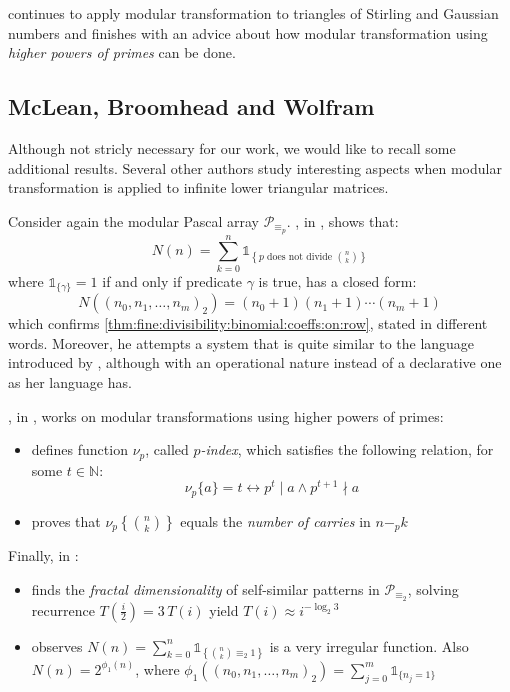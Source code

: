 \citeauthor{sved:1988} continues to apply modular transformation to triangles
of Stirling and Gaussian numbers and finishes with an advice about how modular
transformation using \emph{higher powers of primes} can be done.

\subsection{McLean, Broomhead and Wolfram}

Although not stricly necessary for our work, we would like to recall some
additional results. Several other authors study interesting aspects when
modular transformation is applied to infinite lower triangular matrices.

Consider again the modular Pascal array $\mathcal{P}_{\equiv_{p}}$.
\citeauthor{broomhead:1972}, in \cite{broomhead:1972}, shows that:
\begin{displaymath}
    N(n)=\sum_{k=0}^{n}{\mathbb{1}_{\left\lbrace p\text{ does not divide }{{n}\choose{k}}\right\rbrace}}
\end{displaymath}
where $\mathbb{1}_{\lbrace \gamma \rbrace}=1$ if and only if predicate $\gamma$ is true,
has a closed form:
\begin{displaymath}
    N((n_{0},n_{1},\ldots,n_{m})_{2})=(n_{0}+1)(n_{1}+1)\cdots(n_{m}+1)
\end{displaymath}
which confirms \autoref{thm:fine:divisibility:binomial:coeffs:on:row}, stated in different words.
Moreover, he attempts a system that is quite similar to the language introduced by \citeauthor{sved:1988},
although with an operational nature instead of a declarative one as her language has.

\citeauthor{mclean:1974}, in \cite{mclean:1974}, works on modular transformations using
higher powers of primes:
\begin{itemize}
    \item defines function $\nu_{p}$, called \emph{$p$-index}, which satisfies the following relation,
        for some $t\in\mathbb{N}$: 
        \begin{displaymath}
            \nu_{p}\lbrace a\rbrace =t \leftrightarrow p^{t}\mid a \wedge p^{t+1}\nmid a
        \end{displaymath}
    \item proves that {$\nu_{p}\left\lbrace {{n}\choose{k}}\right\rbrace $} 
        equals the \emph{number of carries} in $n-_{p}k$
\end{itemize}

Finally, \citeauthor{wolfram:1984} in \cite{wolfram:1984}:
\begin{itemize}
    \item finds the \emph{fractal dimensionality} of self-similar patterns in $\mathcal{P}_{\equiv_{2}}$,
        solving recurrence $T\left(\frac{i}{2}\right)=3\,T(i)$ yield $T(i)\approx i^{-\log_{2}{3}}$
    \item observes $N(n)=\sum_{k=0}^{n}{\mathbb{1}_{\left\lbrace{{n}\choose{k}}\equiv_{2}1\right\rbrace}}$ 
        is a very irregular function. Also $N(n)=2^{\phi_{1}(n)}$, where $ \phi_{1}((n_{0},n_{1},\ldots,n_{m})_{2})=
            \sum_{j=0}^{m}{\mathbb{1}_{\lbrace n_{j}=1\rbrace} }$
\end{itemize}
